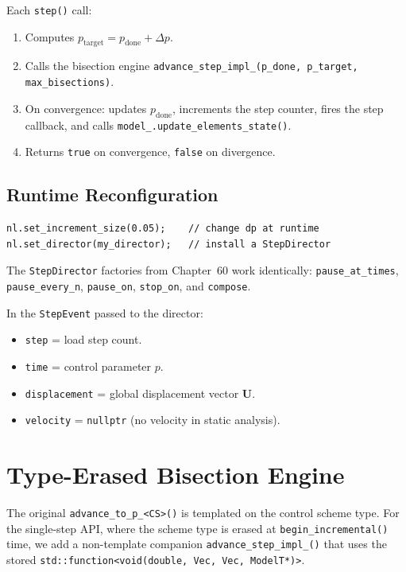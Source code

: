 Each \texttt{step()} call:
\begin{enumerate}
  \item Computes $p_\text{target} = p_\text{done} + \Delta p$.
  \item Calls the bisection engine
        \texttt{advance\_step\_impl\_(p\_done, p\_target, max\_bisections)}.
  \item On convergence: updates $p_\text{done}$, increments the step counter,
        fires the step callback, and calls
        \texttt{model\_.update\_elements\_state()}.
  \item Returns \texttt{true} on convergence, \texttt{false} on divergence.
\end{enumerate}

\subsection{Runtime Reconfiguration}

\begin{verbatim}
nl.set_increment_size(0.05);    // change dp at runtime
nl.set_director(my_director);   // install a StepDirector
\end{verbatim}

The \texttt{StepDirector} factories from Chapter~60 work identically:
\texttt{pause\_at\_times}, \texttt{pause\_every\_n}, \texttt{pause\_on},
\texttt{stop\_on}, and \texttt{compose}.

In the \texttt{StepEvent} passed to the director:
\begin{itemize}
  \item \texttt{step} = load step count.
  \item \texttt{time} = control parameter $p$.
  \item \texttt{displacement} = global displacement vector $\mathbf{U}$.
  \item \texttt{velocity} = \texttt{nullptr} (no velocity in static analysis).
\end{itemize}


\section{Type-Erased Bisection Engine}

The original \texttt{advance\_to\_p\_<CS>()} is templated on the control
scheme type.  For the single-step API, where the scheme type is erased at
\texttt{begin\_incremental()} time, we add a non-template companion
\texttt{advance\_step\_impl\_()} that uses the stored
\texttt{std::function<void(double, Vec, Vec, ModelT*)>}.

